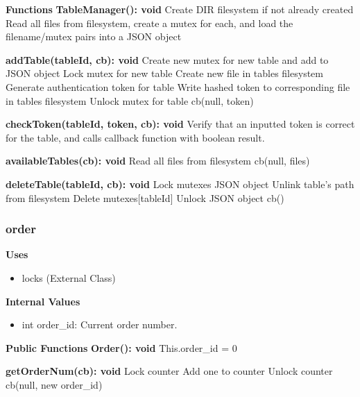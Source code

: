 \documentclass [10pt]{article}
\begin{document}
\textbf{Functions}
\textbf{TableManager(): void}
Create DIR filesystem if not already created
Read all files from filesystem, create a mutex for each, and load the filename/mutex pairs into a JSON object

\textbf{addTable(tableId, cb): void}
Create new mutex for new table and add to JSON object
Lock mutex for new table
Create new file in tables filesystem
Generate authentication token for table
Write hashed token to corresponding file in tables filesystem
Unlock mutex for table
cb(null, token)

\textbf{checkToken(tableId, token, cb): void}
Verify that an inputted token is correct for the table, and calls callback function with boolean result.

\textbf{availableTables(cb): void}
Read all files from filesystem
cb(null, files)

\textbf{deleteTable(tableId, cb): void}
Lock mutexes JSON object
Unlink table’s path from filesystem
Delete mutexes[tableId]
Unlock JSON object
cb()

\subsubsection{order}
\textbf{Uses}
\begin{itemize}
	\item locks (External Class)
\end{itemize}

\textbf{Internal Values}
\begin{itemize}
	\item int order\_id: Current order number.
\end{itemize}

\textbf{Public Functions}
\textbf{Order(): void}
This.order\_id = 0

\textbf{getOrderNum(cb): void}
Lock counter
Add one to counter
Unlock counter
cb(null, new order\_id)
\end{document}
